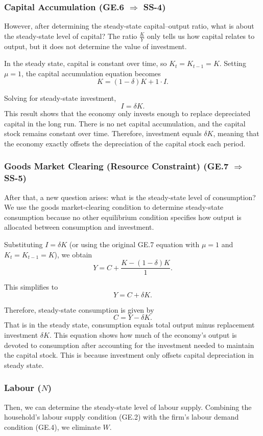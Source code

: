 \documentclass[12pt]{article}
\begin{document}
\subsubsection{Capital Accumulation (GE.6 $\Longrightarrow$ SS-4)}
However, after determining the steady-state capital–output ratio, what is about the steady-state level of capital?
The ratio $\frac{K}{Y}$ only tells us how capital relates to output, but it does not determine the value of investment.

In the steady state, capital is constant over time, so $K_t = K_{t-1} = K$.  
Setting $\mu = 1$, the capital accumulation equation becomes
\[
K = (1-\delta)K + 1 \cdot I.
\]

Solving for steady-state investment,
\[
I = \delta K.
\tag{23}
\]
This result shows that the economy only invests enough to replace depreciated capital in the long run.
There is no net capital accumulation, and the capital stock remains constant over time.
Therefore, investment equals $\delta K$, meaning that the economy exactly offsets the depreciation of the capital stock each period.

\subsubsection{Goods Market Clearing (Resource Constraint) (GE.7 $\Longrightarrow$ SS-5)}
After that, a new question arises: what is the steady-state level of consumption?
We use the goods market-clearing condition to determine steady-state consumption because no other equilibrium condition specifies how output is allocated between consumption and investment.


Substituting $I = \delta K$ (or using the original GE.7 equation with $\mu = 1$ and 
$K_t = K_{t-1} = K$), we obtain
\[
Y = C + \frac{K - (1-\delta)K}{1}.
\]

This simplifies to
\[
Y = C + \delta K.
\]

Therefore, steady-state consumption is given by
\[
C = Y - \delta K.
\tag{25}
\]
That is in the steady state, consumption equals total output minus replacement investment $\delta K$. 
This equation shows how much of the economy's output is devoted to consumption after accounting for the investment needed to maintain the capital stock. This is because investment only offsets capital depreciation in steady state.
\subsubsection{Labour ($N$)}
Then, we can determine the steady-state level of labour supply.
Combining the household's labour supply condition (GE.2) with the firm's labour demand
condition (GE.4), we eliminate $W$.
\end{document}
